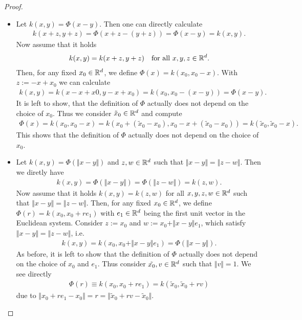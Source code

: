 \begin{proof}
\begin{itemize}
\item Let $k(x, y) = \Phi(x-y)$. 
Then one can directly calculate
\begin{align*}
k(x + z, y + z) = \Phi(x + z - (y+z)) = \Phi(x - y) = k(x, y).
\end{align*}
Now assume that it holds
\begin{align*}
k(x, y) = k(x+z, y+z) \quad \text{for all\ } x, y, z \in \mathbb{R}^d.
\end{align*}
Then, for any fixed $x_0 \in \mathbb{R}^d$, we define $\Phi(x) = k(x_0, x_0 - x)$. 
With $z:= -x+x_0$ we can calculate
\begin{align*}
k(x, y) = k(x-x+x0, y-x+x_0) = k(x_0, x_0-(x-y)) = \Phi(x-y).
\end{align*}
It is left to show, that the definition of $\Phi$ actually does not depend on the choice of $x_0$.
Thus we consider $\tilde{x}_0 \in \mathbb{R}^d$ and compute
\begin{align*}
\Phi(x) = k(x_0, x_0 - x) = k(x_0 + (\tilde{x}_0 - x_0), x_0 - x + (\tilde{x}_0 - x_0)) = k(\tilde{x}_0, \tilde{x}_0 - x).
\end{align*}
This shows that the definition of $\Phi$ actually does not depend on the choice of $x_0$.
\item Let $k(x, y) = \Phi(\Vert x - y\Vert)$ and $z, w \in \mathbb{R}^d$ such that $\Vert x - y\Vert = \Vert z - w\Vert$. 
Then we diretly have
\begin{align*}
k(x, y) = \Phi(\Vert x - y\Vert) = \Phi(\Vert z - w\Vert) = k(z, w).
\end{align*}
Now assume that it holds $k(x, y) = k(z, w)$ for all $x, y, z, w \in \mathbb{R}^d$ such that $\Vert x - y \Vert = \Vert z - w \Vert$.
Then, for any fixed $x_0 \in \mathbb{R}^d$, we define $\Phi(r) = k(x_0, x_0 + re_1)$ with $e_1 \in \mathbb{R}^d$ being the first unit vector in the Euclidean system.
Consider $z := x_0$ and $w := x_0 + \Vert x - y \Vert e_1$,
which satisfy $\Vert x - y \Vert = \Vert z - w\Vert$, i.e.\
\begin{align*}
k(x, y) = k(x_0, x_0 + \Vert x - y \Vert e_1) = \Phi(\Vert x - y \Vert).
\end{align*}
As before, it is left to show that the definition of $\Phi$ actually does not depend on the choice of $x_0$ and $e_1$.
Thus consider $\tilde{x_0}, v \in \mathbb{R}^d$ such that $\Vert v \Vert = 1$.
We see directly
\begin{align*}
\Phi(r) \equiv k(x_0, x_0 + re_1) = k(\tilde{x}_0, \tilde{x}_0 + rv)
\end{align*}
due to $\Vert x_0 + re_1 - x_0 \Vert = r = \Vert \tilde{x}_0 + rv - \tilde{x}_0 \Vert$.
\end{itemize}

\end{proof}

